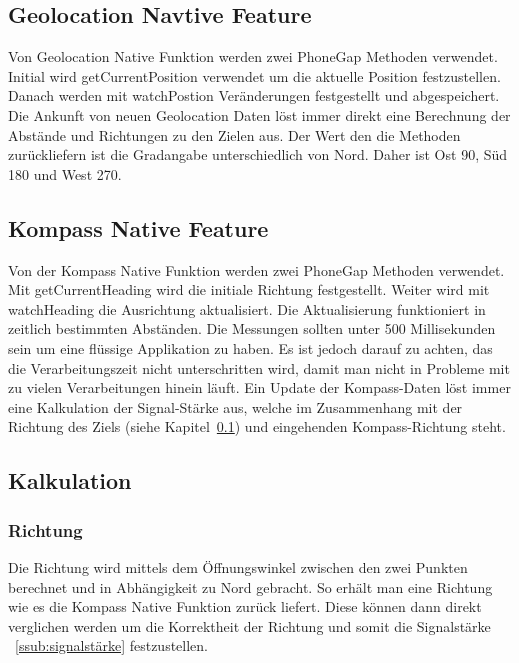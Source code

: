 \subsection{Geolocation Navtive Feature} %
\label{sub:geolocation_native_feature}
Von Geolocation Native Funktion werden zwei PhoneGap Methoden verwendet. Initial wird getCurrentPosition verwendet um die aktuelle Position festzustellen. Danach werden mit watchPostion Veränderungen festgestellt und abgespeichert. Die Ankunft von neuen Geolocation Daten löst immer direkt eine Berechnung der Abstände und Richtungen zu den Zielen aus. Der Wert den die Methoden zurückliefern ist die Gradangabe unterschiedlich von Nord. Daher ist Ost 90, Süd 180 und West 270.

\subsection{Kompass Native Feature} %
\label{sub:kompass_native_feature}
Von der Kompass Native Funktion werden zwei PhoneGap Methoden verwendet. Mit getCurrentHeading wird die initiale Richtung festgestellt. Weiter wird mit watchHeading die Ausrichtung aktualisiert. Die Aktualisierung funktioniert in zeitlich bestimmten Abständen. Die Messungen sollten unter 500 Millisekunden sein um eine flüssige Applikation zu haben. Es ist jedoch darauf zu achten, das die Verarbeitungszeit nicht unterschritten wird, damit man nicht in Probleme mit zu vielen Verarbeitungen hinein läuft. Ein Update der Kompass-Daten löst immer eine Kalkulation der Signal-Stärke aus, welche im Zusammenhang mit der Richtung des Ziels (siehe Kapitel~\ref{sub:geolocation_native_feature}) und eingehenden Kompass-Richtung steht.

\subsection{Kalkulation} %
\label{sub:kalkulation}
\subsubsection{Richtung} %
\label{ssub:richtung}
Die Richtung wird mittels dem Öffnungswinkel zwischen den zwei Punkten berechnet und in Abhängigkeit zu Nord gebracht. So erhält man eine Richtung wie es die Kompass Native Funktion zurück liefert. Diese können dann direkt verglichen werden um die Korrektheit der Richtung und somit die Signalstärke ~\ref{ssub:signalstärke}
 festzustellen. 
